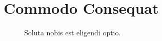 
\chapter{Commodo Consequat}
\label{ch:commodo}

\begin{figure}[htb]
  \centering
  \caption{Soluta nobis est eligendi optio.}
  \label{fig:soluta-nobis}
\end{figure}

